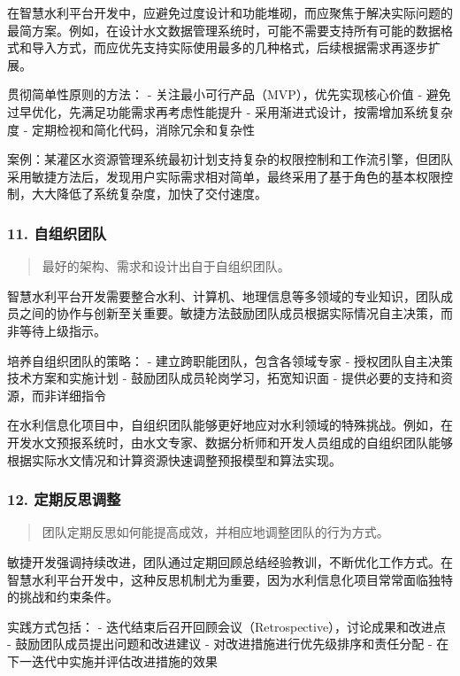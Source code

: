 在智慧水利平台开发中，应避免过度设计和功能堆砌，而应聚焦于解决实际问题的最简方案。例如，在设计水文数据管理系统时，可能不需要支持所有可能的数据格式和导入方式，而应优先支持实际使用最多的几种格式，后续根据需求再逐步扩展。

贯彻简单性原则的方法： - 关注最小可行产品（MVP），优先实现核心价值 -
避免过早优化，先满足功能需求再考虑性能提升 -
采用渐进式设计，按需增加系统复杂度 -
定期检视和简化代码，消除冗余和复杂性

案例：某灌区水资源管理系统最初计划支持复杂的权限控制和工作流引擎，但团队采用敏捷方法后，发现用户实际需求相对简单，最终采用了基于角色的基本权限控制，大大降低了系统复杂度，加快了交付速度。

\subsubsection{11. 自组织团队}\label{ux81eaux7ec4ux7ec7ux56e2ux961f}

\begin{quote}
最好的架构、需求和设计出自于自组织团队。
\end{quote}

智慧水利平台开发需要整合水利、计算机、地理信息等多领域的专业知识，团队成员之间的协作与创新至关重要。敏捷方法鼓励团队成员根据实际情况自主决策，而非等待上级指示。

培养自组织团队的策略： - 建立跨职能团队，包含各领域专家 -
授权团队自主决策技术方案和实施计划 - 鼓励团队成员轮岗学习，拓宽知识面 -
提供必要的支持和资源，而非详细指令

在水利信息化项目中，自组织团队能够更好地应对水利领域的特殊挑战。例如，在开发水文预报系统时，由水文专家、数据分析师和开发人员组成的自组织团队能够根据实际水文情况和计算资源快速调整预报模型和算法实现。

\subsubsection{12.
定期反思调整}\label{ux5b9aux671fux53cdux601dux8c03ux6574}

\begin{quote}
团队定期反思如何能提高成效，并相应地调整团队的行为方式。
\end{quote}

敏捷开发强调持续改进，团队通过定期回顾总结经验教训，不断优化工作方式。在智慧水利平台开发中，这种反思机制尤为重要，因为水利信息化项目常常面临独特的挑战和约束条件。

实践方式包括： -
迭代结束后召开回顾会议（Retrospective），讨论成果和改进点 -
鼓励团队成员提出问题和改进建议 - 对改进措施进行优先级排序和责任分配 -
在下一迭代中实施并评估改进措施的效果


